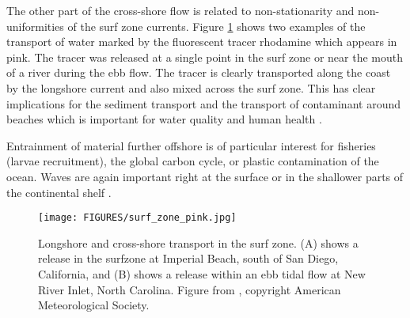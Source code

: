 The other part of the cross-shore flow is related to non-stationarity and non-uniformities of the surf zone currents. Figure \ref{fig:surf_pink} shows two examples of the transport of water marked by the fluorescent tracer rhodamine which appears in pink. The tracer was released at a single point in the surf zone or near the mouth of a river during the ebb flow. 
The tracer is clearly transported along the coast by the longshore current and also mixed across the surf zone. This has clear implications for the sediment transport and the transport of contaminant around beaches which is important for water quality and human health \citep{Delpey&al.2014}.


 Entrainment of material further offshore is of particular interest for fisheries (larvae recruitment), the global carbon cycle, or plastic contamination of the ocean. Waves are again important right at the surface or in the shallower parts of the continental shelf \citep{Lentz&al.2008,Onink&al.2019}.

\begin{figure}[htb]
\centerline{\texttt{[image: FIGURES/surf\_zone\_pink.jpg]}}
  \caption{Longshore and cross-shore transport in the surf zone. (A) shows a release in the surfzone at Imperial Beach, south of San Diego, California,
and (B) shows a release within an ebb tidal flow at New River Inlet, North Carolina. Figure from \cite{Clark&al.2014}, copyright American Meteorological Society.}
    {}
\label{fig:surf_pink}
\end{figure}




